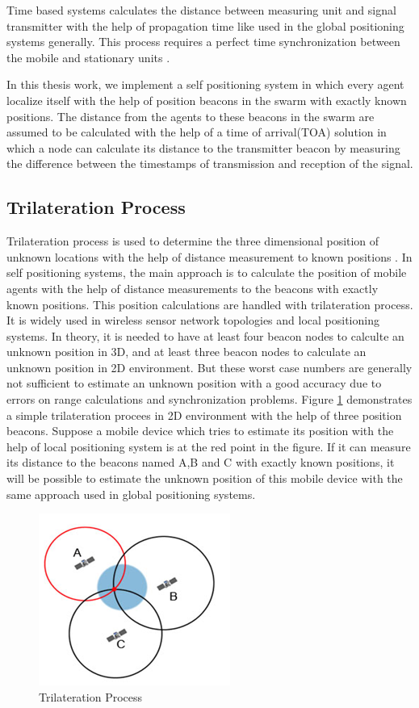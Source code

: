 Time based systems calculates the distance between measuring unit and signal transmitter with the help of propagation time like used in the global positioning systems generally. This process requires a perfect time synchronization between the mobile and stationary units \cite{20}.

In this thesis work, we implement a self positioning system in which every agent localize itself with the help of position beacons in the swarm with exactly known positions. The distance from the agents to these beacons in the swarm are assumed to be calculated with the help of a time of arrival(TOA) solution in which a node can calculate its distance to the transmitter beacon by measuring the difference between the timestamps of transmission and reception of the signal. 


\subsection{Trilateration Process} \label{Trilateration_Process_ref}

Trilateration process is used to determine the three dimensional position of unknown locations with the help of distance measurement to known positions \cite{22}. In self positioning systems, the main approach is to calculate the position of mobile agents with the help of distance measurements to the beacons with exactly known positions. This position calculations are handled with trilateration process. It is widely used in wireless sensor network topologies and local positioning systems.  In theory, it is needed to have at least four beacon nodes to calculte an unknown position in 3D, and at least three beacon nodes to calculate an unknown position in 2D environment. But these worst case numbers are generally not sufficient to estimate an unknown position with a good accuracy due to errors on range calculations and synchronization problems. Figure \ref{trilateration_ref} demonstrates a simple trilateration procees in 2D environment with the help of  three position beacons. Suppose a mobile device which tries to estimate its position with the help of local positioning system is at the red point in the figure. If it can measure its distance to the beacons named A,B and C with exactly known positions, it will be possible to estimate the unknown position of this mobile device with the same approach used in global positioning systems. 


\begin{figure}[H]
	\caption{Trilateration Process \cite{101}} \label{trilateration_ref}
	\centering
	\includegraphics[scale = 1]{trilateration}
\end{figure}



